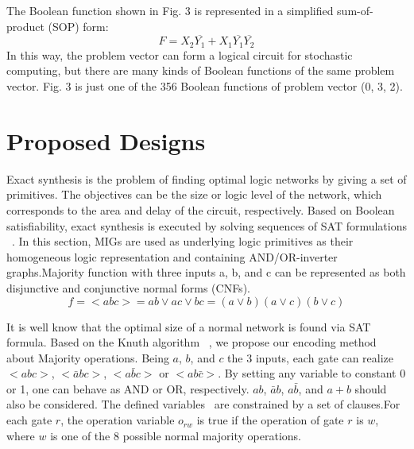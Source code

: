 \documentclass[conference,letterpaper]{IEEEtran}
\begin{document}
The Boolean function shown in Fig. 3 is represented in a simplified sum-of-product (SOP) form:
\begin{equation}
F=X_{2} \overline{Y_{1}}+X_{1} \overline{Y_{1}}     \overline{Y_{2}}
\end{equation}
In this way, the problem vector can form a logical circuit for stochastic computing, but there are many kinds of Boolean functions of the same problem vector. Fig. 3 is just one of the 356 Boolean functions of problem vector (0, 3, 2).

\section*{Proposed Designs}
Exact synthesis is the problem of finding optimal logic networks by giving a set of primitives. The objectives can be the size or logic level of the network, which corresponds to the area and delay
of the circuit, respectively. Based on Boolean satisfiability, exact synthesis is
executed by solving sequences of SAT formulations ~\cite{3}. 
In this section, MIGs are used as underlying logic primitives as their homogeneous logic representation and containing AND/OR-inverter graphs.Majority function with three inputs a, b, and c can be represented as both disjunctive and conjunctive normal forms (CNFs).
\begin{equation}
f=<a b c>=a b \vee a c \vee b c=(a \vee b)(a \vee c)(b \vee c)
\end{equation}

It is well know that the optimal size of a normal network is found via SAT formula. Based on the Knuth algorithm ~\cite{4}, we propose our encoding method about Majority operations. Being $a$, $b$, and $c$ the 3 inputs, each gate can realize $<a b c>$, $<\bar{a} b c>$, $<a \bar{b} c>$ or $<a b \bar{c}>$. By setting any variable to constant 0 or 1, one can behave as AND or OR, respectively. $a b$, $\bar{a} b$, $a \bar{b}$, and $a+b$ should also be considered. The defined variables~\cite{5} are constrained by a set of clauses.For each gate $r$, the operation variable  $o_{r w}$ is true if the operation of gate $r$ is $w$, where $w$ is one of the 8 possible normal majority operations.
\end{document}
